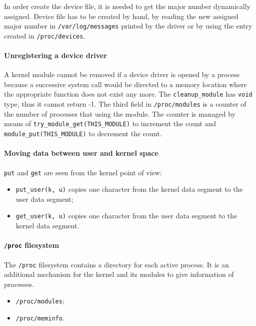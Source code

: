 In order create the device file, it is needed to get the major number dynamically assigned. Device file has to be created by hand, by reading the new assigned major number in \texttt{/var/log/messages} printed by the driver or by using the entry created in \texttt{/proc/devices}.

\paragraph{Unregistering a device driver}
A kernel module cannot be removed if a device driver is opened by a process because a successive system call would be directed to a memory location where the appropriate function does not exist any more. The \texttt{cleanup\_module} has \texttt{void} type, thus it cannot return -1. The third field in \texttt{/proc/modules} is a counter of the number of processes that using the module. The counter is managed by means of \texttt{try\_module\_get(THIS\_MODULE)} to increment the count and \texttt{module\_put(THIS\_MODULE)} to decrement the count.

\paragraph{Moving data between user and kernel space}
\texttt{put} and \texttt{get} are seen from the kernel point of view:

\begin{itemize}
\item \texttt{put\_user(k, u)} copies one character from the kernel data segment to the user data segment;
\item \texttt{get\_user(k, u)} copies one character from the user data segment to the kernel data segment.
\end{itemize}

\paragraph{\texttt{/proc} filesystem}
The \texttt{/proc} filesystem contains a directory for each active process. It is an additional mechanism for the kernel and its modules to give information of processes. 
\begin{itemize}
\item \texttt{/proc/modules};
\item \texttt{/proc/meminfo}.
\end{itemize}